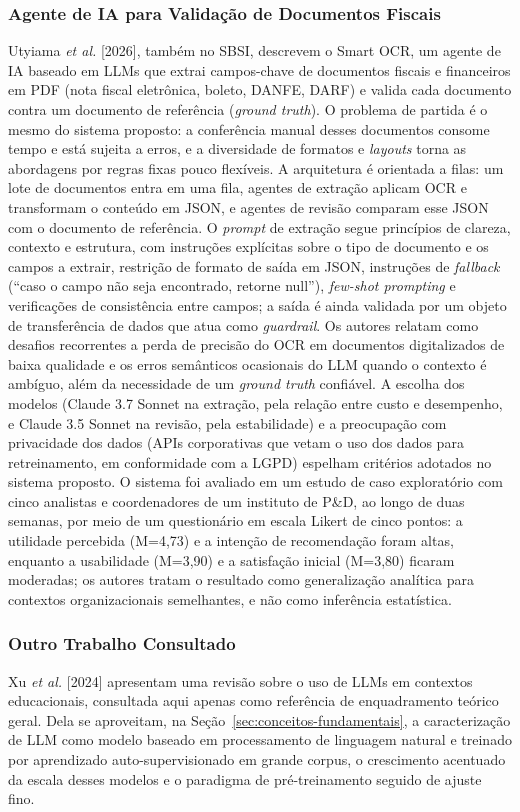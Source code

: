 \documentclass[12pt]{article}
\begin{document}
  \subsubsection{Agente de IA para Validação de Documentos Fiscais}
  Utyiama \emph{et al.} [2026], também no SBSI, descrevem o Smart OCR, um agente de IA baseado em LLMs que extrai campos-chave de documentos fiscais e financeiros em PDF (nota fiscal eletrônica, boleto, DANFE, DARF) e valida cada documento contra um documento de referência (\emph{ground truth}). O problema de partida é o mesmo do sistema proposto: a conferência manual desses documentos consome tempo e está sujeita a erros, e a diversidade de formatos e \emph{layouts} torna as abordagens por regras fixas pouco flexíveis. A arquitetura é orientada a filas: um lote de documentos entra em uma fila, agentes de extração aplicam OCR e transformam o conteúdo em JSON, e agentes de revisão comparam esse JSON com o documento de referência. O \emph{prompt} de extração segue princípios de clareza, contexto e estrutura, com instruções explícitas sobre o tipo de documento e os campos a extrair, restrição de formato de saída em JSON, instruções de \emph{fallback} (``caso o campo não seja encontrado, retorne null''), \emph{few-shot prompting} e verificações de consistência entre campos; a saída é ainda validada por um objeto de transferência de dados que atua como \emph{guardrail}. Os autores relatam como desafios recorrentes a perda de precisão do OCR em documentos digitalizados de baixa qualidade e os erros semânticos ocasionais do LLM quando o contexto é ambíguo, além da necessidade de um \emph{ground truth} confiável. A escolha dos modelos (Claude 3.7 Sonnet na extração, pela relação entre custo e desempenho, e Claude 3.5 Sonnet na revisão, pela estabilidade) e a preocupação com privacidade dos dados (APIs corporativas que vetam o uso dos dados para retreinamento, em conformidade com a LGPD) espelham critérios adotados no sistema proposto. O sistema foi avaliado em um estudo de caso exploratório com cinco analistas e coordenadores de um instituto de P\&D, ao longo de duas semanas, por meio de um questionário em escala Likert de cinco pontos: a utilidade percebida (M=4,73) e a intenção de recomendação foram altas, enquanto a usabilidade (M=3,90) e a satisfação inicial (M=3,80) ficaram moderadas; os autores tratam o resultado como generalização analítica para contextos organizacionais semelhantes, e não como inferência estatística.

  \subsubsection{Outro Trabalho Consultado}
  Xu \emph{et al.} [2024] apresentam uma revisão sobre o uso de LLMs em contextos educacionais, consultada aqui apenas como referência de enquadramento teórico geral. Dela se aproveitam, na Seção~\ref{sec:conceitos-fundamentais}, a caracterização de LLM como modelo baseado em processamento de linguagem natural e treinado por aprendizado auto-supervisionado em grande corpus, o crescimento acentuado da escala desses modelos e o paradigma de pré-treinamento seguido de ajuste fino.
\end{document}
